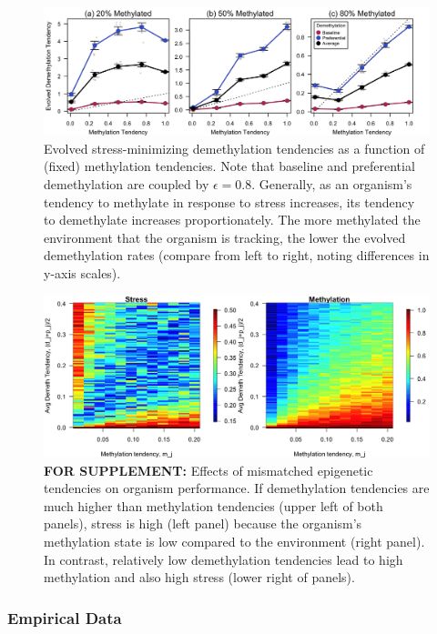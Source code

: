 \documentclass{article}
\begin{document}
\begin{figure}
    \centering
    \includegraphics[width= \textwidth]{Figures/Fig_EvolutionSimulation_3cases.png}
    \caption{Evolved stress-minimizing demethylation tendencies as a function of (fixed) methylation tendencies. Note that baseline and preferential demethylation are coupled by $\epsilon = 0.8$. Generally, as an organism's tendency to methylate in response to stress increases, its tendency to demethylate increases proportionately. The more methylated the environment that the organism is tracking, the lower the evolved demethylation rates (compare from left to right, noting differences in y-axis scales).}
    \label{Fig:Evolution3panel}
\end{figure}

\begin{figure}
    \centering
    \includegraphics[width= \textwidth]{Figures/Fig_Heatmap_v2.png}
    \caption{\textbf{FOR SUPPLEMENT:} Effects of mismatched epigenetic tendencies on organism performance. If demethylation tendencies are much higher than methylation tendencies (upper left of both panels), stress is high (left panel) because the organism's methylation state is low compared to the environment (right panel). In contrast, relatively low demethylation tendencies lead to high methylation and also high stress (lower right of panels).  }
    \label{SFig:StressHeatmap}
\end{figure}


\subsubsection{Empirical Data}
\end{document}
